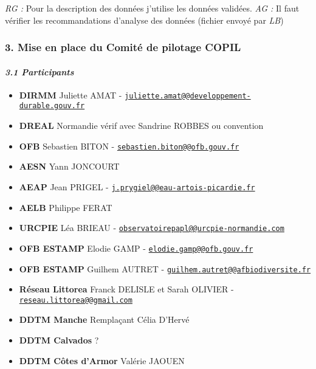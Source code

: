 \documentclass[
]{article}
\providecommand{\tightlist}{%
  \setlength{\itemsep}{0pt}\setlength{\parskip}{0pt}}
\begin{document}
\emph{RG :} Pour la description des données j'utilise les données
validées. \emph{AG :} Il faut vérifier les recommandations d'analyse des
données (fichier envoyé par \emph{LB})

\hypertarget{mise-en-place-du-comituxe9-de-pilotage-copil}{%
\subsubsection{\texorpdfstring{\textbf{3. Mise en place du Comité de
pilotage
COPIL}}{3. Mise en place du Comité de pilotage COPIL}}\label{mise-en-place-du-comituxe9-de-pilotage-copil}}

\hypertarget{participants}{%
\paragraph{\texorpdfstring{\emph{3.1
Participants}}{3.1 Participants}}\label{participants}}

\begin{itemize}
\tightlist
\item
  \textbf{DIRMM} Juliette AMAT -
  \href{mailto:juliette.amat@@developpement-durable.gouv.fr}{\nolinkurl{juliette.amat@@developpement-durable.gouv.fr}}
\item
  \textbf{DREAL} Normandie vérif avec Sandrine ROBBES ou convention
\item
  \textbf{OFB} Sebastien BITON -
  \href{mailto:sebastien.biton@@ofb.gouv.fr}{\nolinkurl{sebastien.biton@@ofb.gouv.fr}}
\item
  \textbf{AESN} Yann JONCOURT
\item
  \textbf{AEAP} Jean PRIGEL -
  \href{mailto:j.prygiel@@eau-artois-picardie.fr}{\nolinkurl{j.prygiel@@eau-artois-picardie.fr}}
\item
  \textbf{AELB} Philippe FERAT
\item
  \textbf{URCPIE} Léa BRIEAU -
  \href{mailto:observatoirepapl@@urcpie-normandie.com}{\nolinkurl{observatoirepapl@@urcpie-normandie.com}}
\item
  \textbf{OFB ESTAMP} Elodie GAMP -
  \href{mailto:elodie.gamp@@ofb.gouv.fr}{\nolinkurl{elodie.gamp@@ofb.gouv.fr}}
\item
  \textbf{OFB ESTAMP} Guilhem AUTRET -
  \href{mailto:guilhem.autret@@afbiodiversite.fr}{\nolinkurl{guilhem.autret@@afbiodiversite.fr}}
\item
  \textbf{Réseau Littorea} Franck DELISLE et Sarah OLIVIER -
  \href{mailto:reseau.littorea@@gmail.com}{\nolinkurl{reseau.littorea@@gmail.com}}
\item
  \textbf{DDTM Manche} Remplaçant Célia D'Hervé
\item
  \textbf{DDTM Calvados} ?
\item
  \textbf{DDTM Côtes d'Armor} Valérie JAOUEN
\end{itemize}
\end{document}
